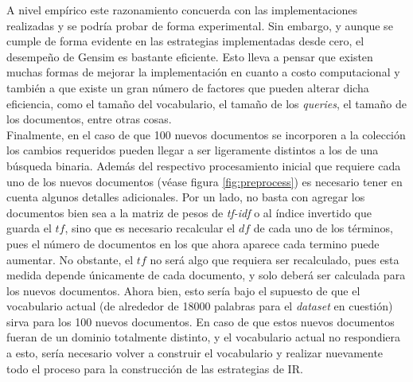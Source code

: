 A nivel empírico este razonamiento concuerda con las implementaciones realizadas y se podría probar de forma experimental. Sin embargo, y aunque se cumple de forma evidente en las estrategias implementadas desde cero, el desempeño de Gensim es bastante eficiente. Esto lleva a pensar que existen muchas formas de mejorar la implementación en cuanto a costo computacional y también a que existe un gran número de factores que pueden alterar dicha eficiencia, como el tamaño del vocabulario, el tamaño de los \textit{queries}, el tamaño de los documentos, entre otras cosas. \\

Finalmente, en el caso de que 100 nuevos documentos se incorporen a la colección los cambios requeridos pueden llegar a ser ligeramente distintos a los de una búsqueda binaria. Además del respectivo procesamiento inicial que requiere cada uno de los nuevos documentos (véase figura \ref{fig:preprocess}) es necesario tener en cuenta algunos detalles adicionales. Por un lado, no basta con agregar los documentos bien sea a la matriz de pesos de \textit{tf-idf} o al índice invertido que guarda el $tf$, sino que es necesario recalcular el $df$ de cada uno de los términos, pues el número de documentos en los que ahora aparece cada termino puede aumentar. No obstante, el $tf$ no será algo que requiera ser recalculado, pues esta medida depende únicamente de cada documento, y solo deberá ser calculada para los nuevos documentos. Ahora bien, esto sería bajo el supuesto de que el vocabulario actual (de alrededor de 18000 palabras para el \textit{dataset} en cuestión) sirva para los 100 nuevos documentos. En caso de que estos nuevos documentos fueran de un dominio totalmente distinto, y el vocabulario actual no respondiera a esto, sería necesario volver a construir el vocabulario y realizar nuevamente todo el proceso para la construcción de las estrategias de IR.
